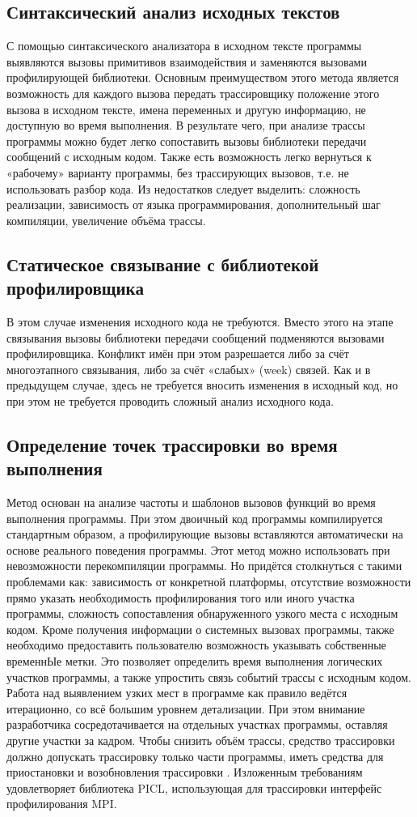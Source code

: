 \subsection{Синтаксический анализ исходных текстов} С помощью синтаксического анализатора в исходном тексте программы выявляются вызовы примитивов взаимодействия и заменяются вызовами профилирующей библиотеки. Основным преимуществом этого метода является возможность для каждого вызова передать трассировщику положение этого вызова в исходном тексте, имена переменных и другую информацию, не доступную во время выполнения. В результате чего, при анализе трассы программы можно будет легко сопоставить вызовы библиотеки передачи сообщений с исходным кодом. Также есть возможность легко вернуться к «рабочему» варианту программы, без трассирующих вызовов, т.е. не использовать разбор кода. Из недостатков следует выделить: сложность реализации, зависимость от языка программирования, дополнительный шаг компиляции, увеличение объёма трассы.
\subsection{Статическое связывание с библиотекой профилировщика} В этом случае изменения исходного кода не требуются. Вместо этого на этапе связывания вызовы библиотеки передачи сообщений подменяются вызовами профилировщика. Конфликт имён при этом разрешается либо за счёт многоэтапного связывания, либо за счёт «слабых» (week) связей. Как и в предыдущем случае, здесь не требуется вносить изменения в исходный код, но при этом не требуется проводить сложный анализ исходного кода.
\subsection{Определение точек трассировки во время выполнения} Метод основан на анализе частоты и шаблонов вызовов функций во время выполнения программы. При этом двоичный код программы компилируется стандартным образом, а профилирующие вызовы вставляются автоматически на основе реального поведения программы. Этот метод можно использовать при невозможности перекомпиляции программы. Но придётся столкнуться с такими проблемами как: зависимость от конкретной платформы, отсутствие возможности прямо указать необходимость профилирования того или иного участка программы, сложность сопоставления обнаруженного узкого места с исходным кодом.
Кроме получения информации о системных вызовах программы, также необходимо предоставить пользователю возможность указывать собственные временнЫе метки. Это позволяет определить время выполнения логических участков программы, а также упростить связь событий трассы с исходным кодом.
Работа над выявлением узких мест в программе как правило ведётся итерационно, со всё большим уровнем детализации. При этом внимание разработчика сосредотачивается на отдельных участках программы, оставляя другие участки за кадром. Чтобы снизить объём трассы, средство трассировки должно допускать трассировку только части программы, иметь средства для приостановки и возобновления трассировки \cite{book3}.
Изложенным требованиям удовлетворяет библиотека PICL, использующая для трассировки интерфейс профилирования MPI.

